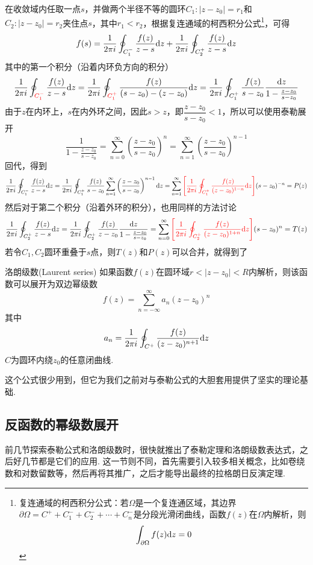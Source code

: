 \documentclass[main.tex]{subfiles}
\begin{document}
在收敛域内任取一点\(s\)，并做两个半径不等的圆环\(C_1:|z-z_0|=r_1\)和\(C_2:|z-z_0|=r_2\)夹住点\(s\)，其中\(r_1<r_2\)，根据复连通域的柯西积分公式\footnote{复连通域的柯西积分公式：若\(\Omega\)是一个复连通区域，其边界\(\partial \Omega = C^++C_1^-+C_2^-+\cdots+C_n^-\)是分段光滑闭曲线，函数\(f(z)\)在\(\Omega\)内解析，则\[\int_{\partial \Omega}f(z){\rm d}z=0\]}，可得
\[f(s) = \frac{1}{2\pi i}\oint_{C_1^-}\frac{f(z)}{z-s}{\rm d}z + \frac{1}{2\pi i}\oint_{C_2^+}\frac{f(z)}{z-s}{\rm d}z\]
其中的第一个积分（沿着内环负方向的积分）
\[\frac{1}{2\pi i}\oint_{\color{red} C_1^-}\frac{f(z)}{z-s}{\rm d}z = \frac{1}{2\pi i}\oint_{\color{red} C_1^+}\frac{f(z)}{(s-z_0)-(z-z_0)}{\rm d}z = \frac{1}{2\pi i}\oint_{C_1^+}\frac{f(z)}{s-z_0}\frac{{\rm d}z}{1-\frac{z-z_0}{s-z_0}}\]
由于\(z\)在内环上，\(s\)在内外环之间，因此\(s>z\)，即\(\dfrac{z-z_0}{s-z_0}<1\)，所以可以使用泰勒展开
\[\frac{1}{1-\frac{z-z_0}{s-z_0}} = \sum_{n=0}^{\infty}\left(\frac{z-z_0}{s-z_0}\right)^{n} = \sum_{n=1}^{\infty}\left(\frac{z-z_0}{s-z_0}\right)^{n-1}\]
回代，得到
\[\frac{1}{2\pi i}\oint_{C_1^-}\frac{f(z)}{z-s}{\rm d}z = \frac{1}{2\pi i}\oint_{C_1^+}\frac{f(z)}{s-z_0}\sum_{n=1}^{\infty}\left(\frac{z-z_0}{s-z_0}\right)^{n-1}{\rm d}z = \sum_{n=1}^{\infty}{\color{red}\left[\frac{1}{2\pi i}\oint_{C_1^+}\frac{f(z)}{(z-z_0)^{1-n}}{\rm d}z\right]}(s-z_0)^{-n} = P(z)\]
然后对于第二个积分（沿着外环的积分），也用同样的方法讨论
\[\frac{1}{2\pi i}\oint_{C_2^+}\frac{f(z)}{z-s}{\rm d}z = \frac{1}{2\pi i}\oint_{C_2^+}\frac{f(z)}{z-z_0}\frac{{\rm d}z}{1-\frac{z-z_0}{s-z_0}} = \sum_{n=0}^{\infty}{\color{red}\left[\frac{1}{2\pi i}\oint_{C_2^+}\frac{f(z)}{(z-z_0)^{1+n}}{\rm d}z\right]}(s-z_0)^{n} = T(z)\]
若令\(C_1,C_2\)圆环重叠于\(s\)点，则\(T(z)\)和\(P(z)\)可以合并，就得到了
\begin{theorem}{洛朗级数(Laurent series)}
    如果函数\(f(z)\)在圆环域\(r<|z-z_0|<R\)内解析，则该函数可以展开为双边幂级数
    \[f(z) = \sum_{n=-\infty}^{\infty}a_n(z-z_0)^n\]
    其中
    \[a_n=\frac{1}{2\pi i}\oint_{C^+}\frac{f(z)}{(z-z_0)^{n+1}}{\rm d}z\]
    \(C\)为圆环内绕\(z_0\)的任意闭曲线.
\end{theorem}
这个公式很少用到，但它为我们之前对与泰勒公式的大胆套用提供了坚实的理论基础.

\subsection{反函数的幂级数展开}

前几节探索泰勒公式和洛朗级数时，很快就推出了泰勒定理和洛朗级数表达式，之后好几节都是它们的应用. 这一节则不同，首先需要引入较多相关概念，比如卷绕数和对数留数等，然后再将其推广，之后才能导出最终的拉格朗日反演定理.
\end{document}
